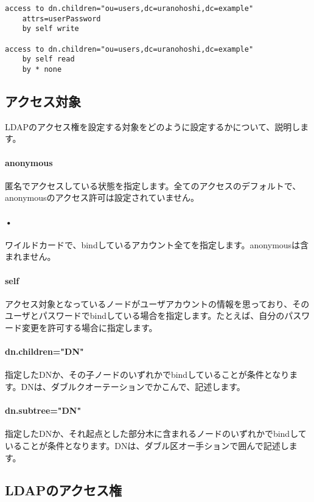 \begin{verbatim}
access to dn.children="ou=users,dc=uranohoshi,dc=example"
    attrs=userPassword
    by self write

access to dn.children="ou=users,dc=uranohoshi,dc=example"
    by self read
    by * none
\end{verbatim}

\subsection{アクセス対象}

LDAPのアクセス権を設定する対象をどのように設定するかについて、説明します。

\paragraph{anonymous}
匿名でアクセスしている状態を指定します。全てのアクセスのデフォルトで、anonymousのアクセス許可は設定されていません。

\paragraph{•}
ワイルドカードで、bindしているアカウント全てを指定します。anonymousは含まれません。

\paragraph{self}
アクセス対象となっているノードがユーザアカウントの情報を思っており、そのユーザとパスワードでbindしている場合を指定します。たとえば、自分のパスワード変更を許可する場合に指定します。

\paragraph{dn.children="DN"}
指定したDNか、その子ノードのいずれかでbindしていることが条件となります。DNは、ダブルクオーテーションでかこんで、記述します。

\paragraph{dn.subtree="DN"}
指定したDNか、それ起点とした部分木に含まれるノードのいずれかでbindしていることが条件となります。DNは、ダブル区オー手ションで囲んで記述します。

\subsection{LDAPのアクセス権}

